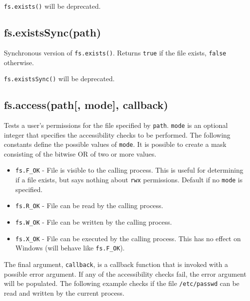 \texttt{fs.exists()} will be deprecated.

\subsection{fs.existsSync(path)}\label{fs.existssyncpath}

Synchronous version of \texttt{fs.exists()}. Returns \texttt{true} if
the file exists, \texttt{false} otherwise.

\texttt{fs.existsSync()} will be deprecated.

\subsection{fs.access(path{[}, mode{]},
callback)}\label{fs.accesspath-mode-callback}

Tests a user's permissions for the file specified by \texttt{path}.
\texttt{mode} is an optional integer that specifies the accessibility
checks to be performed. The following constants define the possible
values of \texttt{mode}. It is possible to create a mask consisting of
the bitwise OR of two or more values.

\begin{itemize}
\itemsep1pt\parskip0pt
\item
  \texttt{fs.F\_OK} - File is visible to the calling process. This is
  useful for determining if a file exists, but says nothing about
  \texttt{rwx} permissions. Default if no \texttt{mode} is specified.
\item
  \texttt{fs.R\_OK} - File can be read by the calling process.
\item
  \texttt{fs.W\_OK} - File can be written by the calling process.
\item
  \texttt{fs.X\_OK} - File can be executed by the calling process. This
  has no effect on Windows (will behave like \texttt{fs.F\_OK}).
\end{itemize}

The final argument, \texttt{callback}, is a callback function that is
invoked with a possible error argument. If any of the accessibility
checks fail, the error argument will be populated. The following example
checks if the file \texttt{/etc/passwd} can be read and written by the
current process.

\begin{Shaded}
\begin{Highlighting}[]
\NormalTok{(}\NormalTok{, } \NormalTok{| }\NormalTok{, }
   \NormalTok{: }\NormalTok{);}
\NormalTok{\});}
\end{Highlighting}
\end{Shaded}

